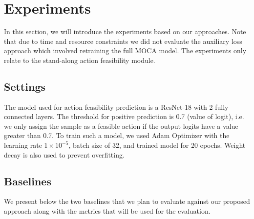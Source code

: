 \documentclass[11pt,a4paper]{article}
\begin{document}

\section{Experiments}

In this section, we will introduce the experiments based on our approaches. Note that due to time and resource constraints we did not evaluate the auxiliary loss approach which involved retraining the full MOCA model. The experiments only relate to the stand-along action feasibility module.

\subsection{Settings}
The model used for action feasibility prediction is a ResNet-18 with 2 fully connected layers. The threshold for positive prediction is 0.7 (value of logit), i.e. we only assign the sample as a feasible action if the output logits have a value greater than 0.7. To train such a model, we used Adam Optimizer with the learning rate $1\times10^{-5}$, batch size of 32, and trained model for 20 epochs. Weight decay is also used to prevent overfitting.

\subsection{Baselines}
We present below the two baselines that we plan to evaluate against our proposed approach along with the metrics that will be used for the evaluation.
\end{document}
